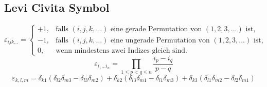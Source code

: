\documentclass[a4paper]{scrartcl}
\begin{document}
\subsection{Levi Civita Symbol}
\label{sec-13-3}
\begin{equation}
\varepsilon_{ijk \dots} =
\begin{cases}
+1, & \mbox{falls }(i,j,k,\dots) \mbox{ eine gerade Permutation von } (1,2,3,\dots) \mbox{ ist,} \\
-1, & \mbox{falls }(i,j,k,\dots) \mbox{ eine ungerade Permutation von } (1,2,3,\dots) \mbox{ ist,} \\
0,  & \mbox{wenn mindestens zwei Indizes gleich sind.}
\end{cases}
\end{equation}
\begin{equation}
\varepsilon_{i_1\dots i_n} =
\prod_{1\le p<q\le n} \frac{i_p-i_q}{p-q}
\end{equation}
\begin{equation}
\varepsilon_{k,l,m}=\delta_{k1}(\delta_{l2}\delta_{m3} - \delta_{l3}\delta_{m2}) + \delta_{k2}(\delta_{l3}\delta_{m1} - \delta_{l1}\delta_{m3}) + \delta_{k3}(\delta_{l1}\delta_{m2} - \delta_{l2}\delta_{m1})
\end{equation}
\end{document}
